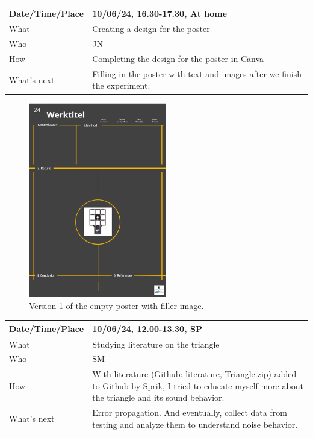 \documentclass{article}
\begin{document}
\begin{table}[H]
\begin{tabular}{|p{1.5in}|p{4in}|}
\hline
Date/Time/Place & 10/06/24, 16.30-17.30, At home \\ \hline
What            &  Creating a design for the poster\\ \hline
Who             &  JN \\ \hline
How             &  Completing the design for the poster in Canva\\ \hline
What's next     &  Filling in the poster with text and images after we finish the experiment.\\ \hline
\end{tabular}
\end{table}

\begin{figure}[H]
    \centering
    \includegraphics[width=6cm]{PosterV1.png}
    \caption{Version 1 of the empty poster with filler image.}   
\end{figure}

\begin{table}[H]
\begin{tabular}{|p{1.5in}|p{4in}|}
\hline
Date/Time/Place &  10/06/24, 12.00-13.30, SP\\ \hline
What            &  Studying literature on the triangle \\ \hline
Who             &  SM\\ \hline
How             &  With literature (Github: literature, Triangle.zip) added to Github by Sprik, I tried to educate myself more about the triangle and its sound behavior.\\ \hline
What's next     &   Error propagation. And eventually, collect data from testing and analyze them to understand noise behavior.\\ \hline
\end{tabular}
\end{table}
\end{document}

